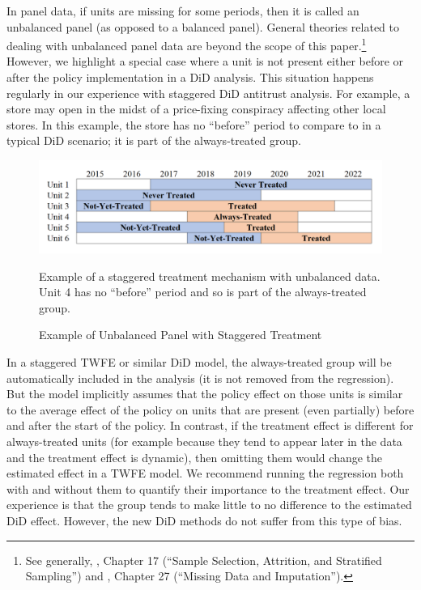 \documentclass[12pt]{article}
\begin{document}
In panel data, if units are missing for some periods, then it is called an unbalanced panel (as opposed to a balanced panel). General theories related to dealing with unbalanced panel data are beyond the scope of this paper.\footnote{See generally, \citet{wooldridge2010a}, Chapter 17 (“Sample Selection, Attrition, and Stratified Sampling”) and \citet{cameron2020}, Chapter 27 (“Missing Data and Imputation”).}  However, we highlight a special case where a unit is not present either before or after the policy implementation in a DiD analysis. This situation happens regularly in our experience with staggered DiD antitrust analysis. For example, a store may open in the midst of a price-fixing conspiracy affecting other local stores. In this example, the store has no “before” period to compare to in a typical DiD scenario; it is part of the always-treated group.
\begin{figure}[H]
    \centering
    \caption{Example of Unbalanced Panel with Staggered Treatment}
    \includegraphics[width=6in]{Figures/Visual Staggered Unbalanced Treatment.PNG}
    \vspace{2mm}
    \footnotesize \begin{singlespace*}
        \parbox{5.5in}{Example of a staggered treatment mechanism with unbalanced data. Unit 4 has no “before” period and so is part of the always-treated group.}
    \end{singlespace*}
    \label{fig:visual-unbalanced}
\end{figure}
\noindent In a staggered TWFE or similar DiD model, the always-treated group will be automatically included in the analysis (it is not removed from the regression). But the model implicitly assumes that the policy effect on those units is similar to the average effect of the policy on units that are present (even partially) before and after the start of the policy. In contrast, if the treatment effect is different for always-treated units (for example because they tend to appear later in the data and the treatment effect is dynamic), then omitting them would change the estimated effect in a TWFE model. We recommend running the regression both with and without them to quantify their importance to the treatment effect. Our experience is that the group tends to make little to no difference to the estimated DiD effect. However, the new DiD methods do not suffer from this type of bias.
\end{document}

